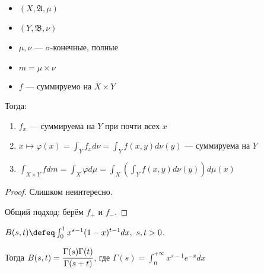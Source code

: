 \begin{theorem}[Фубини]\itemfix
    \begin{itemize}
        \item \((X, \mathfrak{A}, \mu)\)
        \item \((Y, \mathfrak{B}, \nu)\)
        \item \(\mu, \nu\) --- \(\sigma\)-конечные, полные
        \item \(m = \mu \times \nu\)
        \item \(f\) --- суммируемо на \(X \times Y\)
    \end{itemize}

    Тогда:
    \begin{enumerate}
        \item \(f_x\) --- суммируема на \(Y\) при почти всех \(x\)
        \item \(x \mapsto \varphi(x) = \int_Y f_x d\nu = \int_Y f(x, y) d\nu(y)\) --- суммируема на \(Y\)
        \item \(\int_{X \times Y} f dm = \int_X \varphi d \mu = \int_X \left( \int_Y f(x, y) d\nu(y) \right) d\mu(x)\)
    \end{enumerate}
\end{theorem}
\begin{proof}
    Слишком неинтересно.

    Общий подход: берём \(f_{ +}\) и \(f_{ -}\).
\end{proof}

\begin{example}
    \(B(s, t) \defeq \int_0^1 x^{s - 1} (1 - x)^{t - 1} dx,\ s, t > 0\).

    Тогда \(B(s, t) = \cfrac{\Gamma(s)\Gamma(t)}{\Gamma(s + t)}\), где \(\Gamma(s) = \int_0^{+\infty} x^{s - 1}e^{ - x}dx\)
\end{example}

